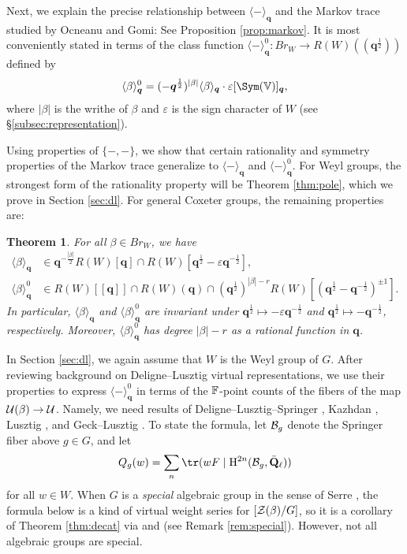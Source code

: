 \documentclass[a4paper,10pt,leqno]{amsart}
\theoremstyle{plain}
\newtheorem{mainthm}{Theorem}
\theoremstyle{plain}
\theoremstyle{plain}
\theoremstyle{definition}
\theoremstyle{remark}
\newcommand{\Br}{\mathit{Br}}
\newcommand{\Q}{\bm{q}}
\newcommand{\QL}{\bar{\mathbf{Q}}_\ell}
\newcommand{\Tr}[1]{\langle{#1}\rangle_{\Q}}
\begin{document}
Next, we explain the precise relationship between $\Tr{-}$ and the Markov trace studied by Ocneanu and Gomi:
See Proposition \ref{prop:markov}.
It is most conveniently stated in terms of the class function $\Tr{-}^0 : \Br_W \to R(W)(\!(\Q^{\frac{1}{2}})\!)$ defined by
\begin{align}
\Tr{\beta}^0 = (-\Q^{\frac{1}{2}})^{|\beta|}\Tr{\beta} \cdot \varepsilon [\Sym(\bb{V})]_{\Q},
\end{align}
where $|\beta|$ is the writhe of $\beta$ and $\varepsilon$ is the sign character of $W$ (see \S\ref{subsec:representation}).

Using properties of $\{-, -\}$, we show that certain rationality and symmetry properties of the Markov trace generalize to $\Tr{-}$ and $\Tr{-}^0$.
For Weyl groups, the strongest form of the rationality property will be Theorem \ref{thm:pole}, which we prove in Section \ref{sec:dl}.
For general Coxeter groups, the remaining properties are:

\begin{mainthm}\label{thm:symmetry}
For all $\beta \in \Br_W$, we have 
\begin{align}
\Tr{\beta} 
&\in \Q^{-\frac{|\beta|}{2}}R(W)[\Q] \cap R(W)[\Q^{\frac{1}{2}} - \varepsilon \Q^{-\frac{1}{2}}],\\
\Tr{\beta}^0
&\in 
	R(W)[\![\Q]\!] \cap R(W)(\Q) \cap
	(\Q^{\frac{1}{2}})^{|\beta| - r}
	R(W)[(\Q^{\frac{1}{2}} - \Q^{-\frac{1}{2}})^{\pm 1}].
\end{align}
In particular, $\Tr{\beta}$ and $\Tr{\beta}^0$ are invariant under $\Q^{\frac{1}{2}} \mapsto -\varepsilon\Q^{-\frac{1}{2}}$ and $\Q^{\frac{1}{2}} \mapsto -\Q^{-\frac{1}{2}}$, respectively.
Moreover, $\Tr{\beta}^0$ has degree $|\beta| - r$ as a rational function in $\Q$.
\end{mainthm}

In Section \ref{sec:dl}, we again assume that $W$ is the Weyl group of $G$.
After reviewing background on Deligne--Lusztig virtual representations, we use their properties to express $\Tr{-}^0$ in terms of the $\bb{F}$-point counts of the fibers of the map $\cal{U}(\beta) \to \cal{U}$.
Namely, we need results of Deligne--Lusztig--Springer \cite[Thm.\ 6.9]{dl} \cite[Thm.\ 5.6]{springer_1976}, Kazhdan \cite{kazhdan}, Lusztig \cite[Cor.\ 4.24-4.25]{lusztig_1984}, and Geck--Lusztig \cite[Prop.\ 1.3]{geck}.
To state the formula, let $\cal{B}_g$ denote the Springer fiber above $g \in G$, and let
\begin{align}
Q_g(w) = \sum_n
{\tr(wF \mid \ur{H}^{2n}(\cal{B}_g, \QL))}
\end{align}
for all $w \in W$.
When $G$ is a \emph{special} algebraic group in the sense of Serre \cite{grothendieck_1958}, the formula below is a kind of virtual weight series for $[\cal{Z}(\beta)/G]$, so it is a corollary of Theorem \ref{thm:decat} via \cite[Appendix]{hr} and \cite[Thm.\ 4.10]{joyce} (see Remark \ref{rem:special}).
However, not all algebraic groups are special.
\end{document}

